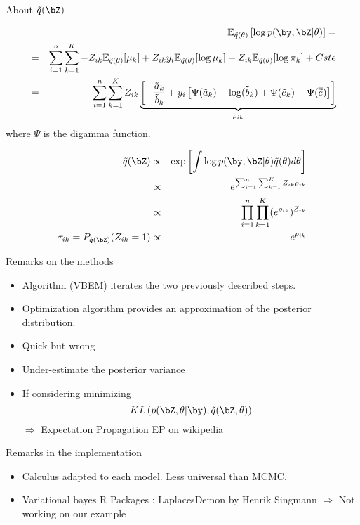   \begin{frame}{About $\tilde{q}(\bZ )$}
  
  {\footnotesize 
  \begin{eqnarray*}
  &&\mathbb{E}_{\tilde{q}(\theta)}\left[\log p(\by,\bZ | \theta) \right]=\\
  &=& \sum_{i=1}^n \sum_{k=1}^K - Z_{ik}\mathbb{E}_{\tilde{q}(\theta)}[\mu_k] + Z_{ik} y_i \mathbb{E}_{\tilde{q}(\theta)}[\log \mu_k]  +  Z_{ik} \mathbb{E}_{\tilde{q}(\theta)}[\log \pi_k] + Cste \\ 
  &=&  \sum_{i=1}^n \sum_{k=1}^K  Z_{ik} \underbrace{ \left[-\frac{\tilde{a}_k}{\tilde{b}_k} + y_i \left[\Psi(\tilde{a}_k) - \log(\tilde{b}_k) +  \Psi(\tilde{e}_k)- \Psi(\overline{\tilde{e}})\right] \right]}_{\rho_{ik}}
  \end{eqnarray*}
   where $\Psi$ is the digamma function.
  }
  
  {\footnotesize 
  \begin{eqnarray*}
  \tilde{q}(\bZ) &\propto& \exp \left[\int \log  p(\by, \bZ |  \theta) \tilde{q}(\theta) d\theta \right]\\
  &\propto& e^{\sum_{i=1}^n \sum_{k=1}^K Z_{ik} \rho_{ik}}\\
  &\propto&\prod_{i=1}^n \prod_{k=1}^K (e^{\rho_{ik}})^{Z_{ik}}\\
  \tau_{ik} = P_{\tilde{q}(\bZ)}(Z_{ik}=1) &\propto& e^{\rho_{ik}}
  \end{eqnarray*}
  }
   
  \end{frame}
 
% 
\begin{frame}{Remarks on the methods}

  \begin{itemize}
   \item Algorithm (VBEM) iterates the two previously described steps.
   \item Optimization algorithm provides an approximation of the posterior distribution. 
    \item Quick but wrong
    \item Under-estimate the posterior variance
     \item If considering minimizing  
    $$ KL\left(p(\bZ, \theta | \by),\tilde{q}(\bZ, \theta)\right)$$ \vert $\Rightarrow $ \noir Expectation Propagation \href{https://en.wikipedia.org/wiki/Expectation_propagation}{EP on wikipedia} 
    \end{itemize}
    \end{frame}
   \begin{frame}{Remarks in the implementation}
    
    \begin{itemize}
      \item Calculus adapted to each model. Less universal than MCMC. 
     \item Variational bayes  \textsf{R} Packages  : LaplacesDemon by Henrik Singmann \vert $\Rightarrow$ \noir Not working on our example
     \end{itemize}
   
  \end{frame}

